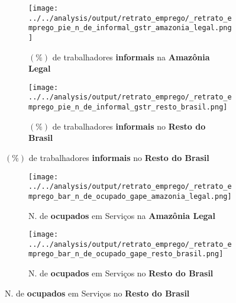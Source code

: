 \documentclass[11pt]{beamer}
\begin{document}
\begin{frame}[label=_retrato_emprego_pie_n_de_informal_gstr]{}
\textit{\hyperlink{indice_principal}{}}
\begin{figure}
\centering
\begin{subfigure}{.5\textwidth}
  \centering
  \texttt{[image: ../../analysis/output/retrato\_emprego/\_retrato\_emprego\_pie\_n\_de\_informal\_gstr\_amazonia\_legal.png]}
  \label{fig:_retrato_emprego_pie_n_de_informal_gstr_amazonia_legal}
  \caption{{\tiny $(\%)$ de trabalhadores \textbf{informais} na \textbf{Amazônia Legal}}}
\end{subfigure}%
\begin{subfigure}{.5\textwidth}
  \centering
  \texttt{[image: ../../analysis/output/retrato\_emprego/\_retrato\_emprego\_pie\_n\_de\_informal\_gstr\_resto\_brasil.png]}
  \label{fig:_retrato_emprego_pie_n_de_informal_gstr_resto_brasil}
   \caption{{\tiny $(\%)$ de trabalhadores \textbf{informais} no \textbf{Resto do Brasil}}}
\end{subfigure}
\end{figure}
\end{frame}

\begin{frame}[label=_retrato_emprego_bar_n_de_ocupado_gape]{}
\textit{\hyperlink{indice_principal}{}}
\begin{figure}
\centering
\begin{subfigure}{.5\textwidth}
  \centering
  \texttt{[image: ../../analysis/output/retrato\_emprego/\_retrato\_emprego\_bar\_n\_de\_ocupado\_gape\_amazonia\_legal.png]}
  \label{fig:_retrato_emprego_bar_n_de_ocupado_gape_amazonia_legal}
  \caption{{\tiny N. de \textbf{ocupados} em Serviços na \textbf{Amazônia Legal}}}
\end{subfigure}%
\begin{subfigure}{.5\textwidth}
  \centering
  \texttt{[image: ../../analysis/output/retrato\_emprego/\_retrato\_emprego\_bar\_n\_de\_ocupado\_gape\_resto\_brasil.png]}
  \label{fig:_retrato_emprego_bar_n_de_ocupado_gape_resto_brasil}
   \caption{{\tiny N. de \textbf{ocupados} em Serviços no \textbf{Resto do Brasil}}}
\end{subfigure}
\end{figure}
\end{frame}
\end{document}
